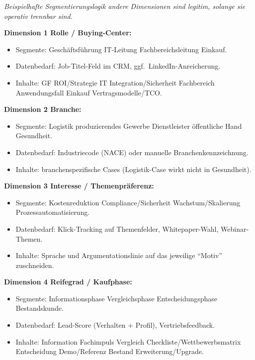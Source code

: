 \documentclass[11pt,a4paper,oneside]{article}
\begin{document}
\begin{loesungbox}
\emph{Beispielhafte Segmentierungslogik \textendash{} andere Dimensionen sind legitim, solange sie operativ trennbar sind.}

\smallskip
\textbf{Dimension 1 \textendash{} Rolle / Buying-Center:}
\begin{itemize}
  \item Segmente: Geschäftsführung \textperiodcentered{} IT-Leitung \textperiodcentered{} Fachbereichsleitung \textperiodcentered{} Einkauf.
  \item Datenbedarf: Job-Titel-Feld im CRM, ggf.\ LinkedIn-Anreicherung.
  \item Inhalte: GF \textrightarrow{} ROI/Strategie \textperiodcentered{} IT \textrightarrow{} Integration/Sicherheit \textperiodcentered{} Fachbereich \textrightarrow{} Anwendungsfall \textperiodcentered{} Einkauf \textrightarrow{} Vertragsmodelle/TCO.
\end{itemize}

\textbf{Dimension 2 \textendash{} Branche:}
\begin{itemize}
  \item Segmente: Logistik \textperiodcentered{} produzierendes Gewerbe \textperiodcentered{} Dienstleister \textperiodcentered{} öffentliche Hand \textperiodcentered{} Gesundheit.
  \item Datenbedarf: Industriecode (NACE) oder manuelle Branchenkennzeichnung.
  \item Inhalte: branchenspezifische Cases (Logistik-Case wirkt nicht in Gesundheit).
\end{itemize}

\textbf{Dimension 3 \textendash{} Interesse / Themenpräferenz:}
\begin{itemize}
  \item Segmente: Kostenreduktion \textperiodcentered{} Compliance/Sicherheit \textperiodcentered{} Wachstum/Skalierung \textperiodcentered{} Prozessautomatisierung.
  \item Datenbedarf: Klick-Tracking auf Themenfelder, Whitepaper-Wahl, Webinar-Themen.
  \item Inhalte: Sprache und Argumentationslinie auf das jeweilige ``Motiv'' zuschneiden.
\end{itemize}

\textbf{Dimension 4 \textendash{} Reifegrad / Kaufphase:}
\begin{itemize}
  \item Segmente: Informationsphase \textperiodcentered{} Vergleichsphase \textperiodcentered{} Entscheidungsphase \textperiodcentered{} Bestandskunde.
  \item Datenbedarf: Lead-Score (Verhalten + Profil), Vertriebsfeedback.
  \item Inhalte: Information \textrightarrow{} Fachimpuls \textperiodcentered{} Vergleich \textrightarrow{} Checkliste/Wettbewerbsmatrix \textperiodcentered{} Entscheidung \textrightarrow{} Demo/Referenz \textperiodcentered{} Bestand \textrightarrow{} Erweiterung/Upgrade.
\end{itemize}


\end{loesungbox}
\end{document}
